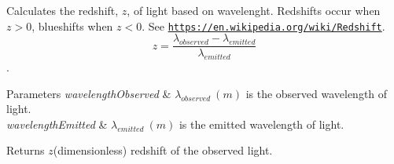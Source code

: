 Calculates the redshift, $z$, of light based on wavelenght. Redshifts occur when $z > 0$, blueshifts when $z < 0$. See \href{https://en.wikipedia.org/wiki/Redshift}{\tt https\+://en.\+wikipedia.\+org/wiki/\+Redshift}. \[z=\frac{\lambda_{observed}-\lambda_{emitted}}{\lambda_{emitted}}\]. 


\begin{DoxyParams}{Parameters}
{\em wavelength\+Observed} & $\lambda_{observed}\ (m)$ is the observed wavelength of light. \\
\hline
{\em wavelength\+Emitted} & $\lambda_{emitted}\ (m)$ is the emitted wavelength of light. \\
\hline
\end{DoxyParams}
\begin{DoxyReturn}{Returns}
$z$(dimensionless) redshift of the observed light. 
\end{DoxyReturn}
